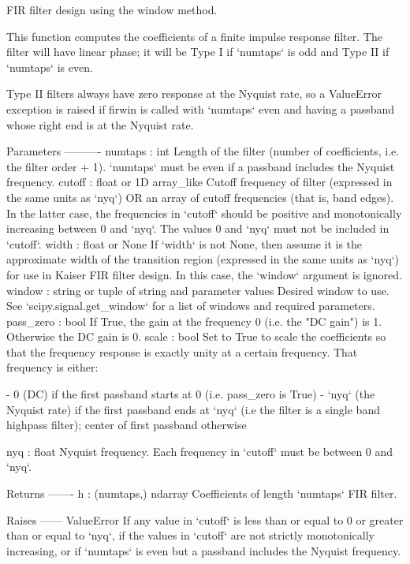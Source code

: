 \begin{DoxyVerb}FIR filter design using the window method.

This function computes the coefficients of a finite impulse response
filter.  The filter will have linear phase; it will be Type I if
`numtaps` is odd and Type II if `numtaps` is even.

Type II filters always have zero response at the Nyquist rate, so a
ValueError exception is raised if firwin is called with `numtaps` even and
having a passband whose right end is at the Nyquist rate.

Parameters
----------
numtaps : int
    Length of the filter (number of coefficients, i.e. the filter
    order + 1).  `numtaps` must be even if a passband includes the
    Nyquist frequency.
cutoff : float or 1D array_like
    Cutoff frequency of filter (expressed in the same units as `nyq`)
    OR an array of cutoff frequencies (that is, band edges). In the
    latter case, the frequencies in `cutoff` should be positive and
    monotonically increasing between 0 and `nyq`.  The values 0 and
    `nyq` must not be included in `cutoff`.
width : float or None
    If `width` is not None, then assume it is the approximate width
    of the transition region (expressed in the same units as `nyq`)
    for use in Kaiser FIR filter design.  In this case, the `window`
    argument is ignored.
window : string or tuple of string and parameter values
    Desired window to use. See `scipy.signal.get_window` for a list
    of windows and required parameters.
pass_zero : bool
    If True, the gain at the frequency 0 (i.e. the "DC gain") is 1.
    Otherwise the DC gain is 0.
scale : bool
    Set to True to scale the coefficients so that the frequency
    response is exactly unity at a certain frequency.
    That frequency is either:

    - 0 (DC) if the first passband starts at 0 (i.e. pass_zero
      is True)
    - `nyq` (the Nyquist rate) if the first passband ends at
      `nyq` (i.e the filter is a single band highpass filter);
      center of first passband otherwise

nyq : float
    Nyquist frequency.  Each frequency in `cutoff` must be between 0
    and `nyq`.

Returns
-------
h : (numtaps,) ndarray
    Coefficients of length `numtaps` FIR filter.

Raises
------
ValueError
    If any value in `cutoff` is less than or equal to 0 or greater
    than or equal to `nyq`, if the values in `cutoff` are not strictly
    monotonically increasing, or if `numtaps` is even but a passband
    includes the Nyquist frequency.


\end{DoxyVerb}
